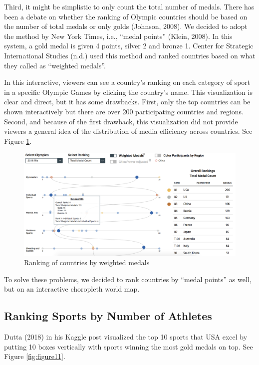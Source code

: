 \documentclass[
]{article}
\begin{document}
Third, it might be simplistic to only count the total number of medals. There has been a debate on whether the ranking of Olympic countries should be based on the number of total medals or only golds (Johnson, 2008). We decided to adopt the method by New York Times, i.e., ``medal points'' (Klein, 2008). In this system, a gold medal is given 4 points, silver 2 and bronze 1. Center for Strategic International Studies (n.d.) used this method and ranked countries based on what they called as ``weighted medals''.

In this interactive, viewers can see a country's ranking on each category of sport in a specific Olympic Games by clicking the country's name. This visualization is clear and direct, but it has some drawbacks. First, only the top countries can be shown interactively but there are over 200 participating countries and regions. Second, and because of the first drawback, this visualization did not provide viewers a general idea of the distribution of media efficiency across countries. See Figure \ref{fig:figure10}.

\begin{figure}

{\centering \includegraphics[width=0.95\linewidth]{static/pics/3-7} 

}

\caption{Ranking of countries by weighted medals}\label{fig:figure10}
\end{figure}

To solve these problems, we decided to rank countries by ``medal points'' as well, but on an interactive choropleth world map.

\hypertarget{lit-ranking}{%
\subsection{Ranking Sports by Number of Athletes}\label{lit-ranking}}

Dutta (2018) in his Kaggle post visualized the top 10 sports that USA excel by putting 10 boxes vertically with sports winning the most gold medals on top. See Figure \ref{fig:figure11}.
\end{document}
